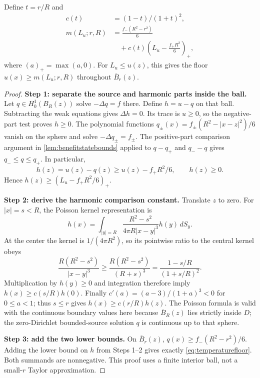 \begin{lemma}
\label{lem:balltemperaturefloor}
Define $t=r/R$ and
\begin{equation}
 \begin{split}
 c(t)&=(1-t)/(1+t)^2,\\
 m(L_u;r,R)&=\frac{f_-(R^2-r^2)}6\\
 &\quad+c(t)\left(L_u-\frac{f_+R^2}6\right)_+,
 \end{split}
 \label{eq:temperaturefloor}
\end{equation}
where $(a)_+=\max(a,0)$. For $L_u\le u(z)$, this gives the floor
$u(x)\ge m(L_u;r,R)$ throughout $\overline B_r(z)$.
\end{lemma}
\begin{proof}
\textbf{Step 1: separate the source and harmonic parts inside the ball.}
Let $q\in H_0^1(B_R(z))$ solve $-\Delta q=f$ there. Define
$h=u-q$ on that ball. Subtracting the weak equations gives $\Delta h=0$.
Its trace is $u\ge0$, so the negative-part test proves $h\ge0$.
The polynomial functions
$q_\pm(x)=f_\pm(R^2-|x-z|^2)/6$ vanish on the sphere and solve
$-\Delta q_\pm=f_\pm$. The positive-part comparison argument in
\cref{lem:benefitstatebounds} applied to $q-q_+$ and $q_--q$ gives
$q_-\le q\le q_+$. In particular,
\[
 h(z)=u(z)-q(z)\ge u(z)-f_+R^2/6,
 \qquad h(z)\ge0.
\]
Hence $h(z)\ge(L_u-f_+R^2/6)_+$.

\textbf{Step 2: derive the harmonic comparison constant.}
Translate $z$ to zero. For $|x|=s<R$, the Poisson kernel representation is
\[
 h(x)=\int_{|y|=R}\frac{R^2-s^2}{4\pi R|x-y|^3}h(y)\,dS_y.
\]
At the center the kernel is $1/(4\pi R^2)$, so its pointwise ratio to the
central kernel obeys
\[
 \frac{R(R^2-s^2)}{|x-y|^3}
 \ge\frac{R(R^2-s^2)}{(R+s)^3}
 =\frac{1-s/R}{(1+s/R)^2}.
\]
Multiplication by $h(y)\ge0$ and integration therefore imply
$h(x)\ge c(s/R)h(0)$. Finally
$c'(a)=(a-3)/(1+a)^3<0$ for $0\le a<1$; thus $s\le r$ gives
$h(x)\ge c(r/R)h(z)$. The Poisson formula is valid with the continuous
boundary values here because $\overline B_R(z)$ lies strictly inside $D$;
the zero-Dirichlet bounded-source solution $q$ is continuous up to that sphere.

\textbf{Step 3: add the two lower bounds.}
On $\overline B_r(z)$,
$q(x)\ge f_-(R^2-r^2)/6$. Adding the lower bound on $h$ from Steps 1--2
gives exactly \cref{eq:temperaturefloor}. Both summands are nonnegative.
This proof uses a finite interior ball, not a small-$r$ Taylor approximation.
\end{proof}

